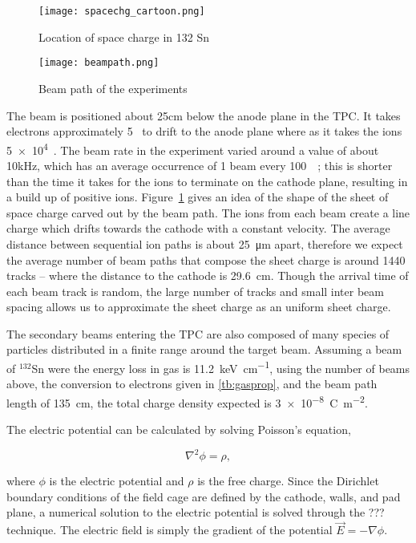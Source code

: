 \begin{figure}[!htb]
\texttt{[image: spacechg\_cartoon.png]}
\caption{Location of space charge in 132 Sn}
\label{fig:spacechg_cartoon}
\end{figure}


\begin{figure}[!htb]
\texttt{[image: beampath.png]}
\caption{Beam path of the experiments}
\label{fig:beampaths}
\end{figure}
 
 
 The beam is positioned about 25\si{\centi\metre} below the anode plane in the TPC. It takes electrons approximately 5\si{\micro\sec} to drift to the anode plane where as it takes the ions \num{5e4}\si{\micro\sec}. The beam rate in the experiment varied around a value of about 10\si{\kilo\hertz}, which has an average occurrence of 1 beam every \SI{100}{\micro\sec}; this is shorter than the time it takes for the ions to terminate on the cathode plane, resulting in a build up of positive ions. Figure~\ref{fig:spacechg_cartoon} gives an idea of the shape of the sheet of space charge carved out by the beam path. The ions from each beam create a line charge which drifts towards the cathode with a constant velocity. The average distance between sequential ion paths is about \SI{25}{\micro\metre} apart, therefore we expect the average number of beam paths that compose the sheet charge is around \num{1440} tracks -- where the distance to the cathode is \SI{29.6}{\centi\metre}. Though the arrival time of each beam track is random, the large number of tracks and small inter beam spacing allows us to approximate the sheet charge as an uniform sheet charge. 
 
 The secondary beams entering the TPC are also composed of many species of particles distributed in a finite range around the target beam. Assuming a beam of ${}^{132}$Sn were the energy loss in gas is \SI{11.2}{\kilo\electronvolt\per\centi\metre}, using the number of beams above, the conversion to electrons given in \ref{tb:gasprop}, and the beam path length of \SI{135}{\centi\metre}, the total charge density expected is \SI{3e-8}{\coulomb\per\metre\squared}. 
 

The electric potential can be calculated by solving Poisson's equation, 

\begin{equation}
\nabla^2 \phi = \rho,
\end{equation}

 where $\phi$ is the electric potential and $\rho$ is the free charge.  Since the Dirichlet boundary conditions of the field cage are defined by the cathode, walls, and pad plane, a numerical solution to the electric potential is solved through the ??? technique. The electric field is simply the gradient of the potential  $\vec{E}= -\nabla \phi$. 
 
